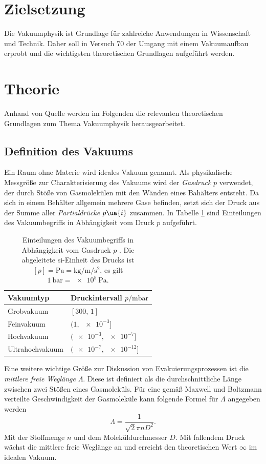 \setcounter{page}{1}
\section*{Zielsetzung}
Die Vakuumphysik ist Grundlage für zahlreiche Anwendungen in Wissenschaft und Technik. Daher
soll in Versuch 70 der Umgang mit einem Vakuumaufbau erprobt und die wichtigsten
theoretischen Grundlagen aufgeführt werden.
\section{Theorie}
Anhand von Quelle \cite{dem1} werden im Folgenden die relevanten theoretischen Grundlagen zum Thema
Vakuumphysik herausgearbeitet.
\subsection{Definition des Vakuums}
Ein Raum ohne Materie wird ideales Vakuum genannt. Als physikalische Messgröße zur Charakterisierung
des Vakuums wird der \emph{Gasdruck} $p$ verwendet, der durch Stöße von Gasmolekülen mit den Wänden eines Bahälters
entsteht. Da sich in einem Behälter allgemein mehrere Gase befinden, setzt sich der Druck aus der Summe aller
\emph{Partialdrücke} $p\ua{i}$ zusammen.
In Tabelle \ref{tab: vakuumbegriffe} sind Einteilungen des Vakuumbegriffs in Abhängigkeit vom
Druck $p$ aufgeführt.
\begin{table}
  \centering
  \caption{Einteilungen des Vakuumbegriffs in Abhängigkeit vom Gasdruck $p$ \cite{dem1}. Die abgeleitete si-Einheit des Drucks ist
  $[p] = \si{\pascal} = \si{\kilogram \per\meter\per \second\squared}$, es gilt $\SI{1}{\bar} = \SI{e5}{\pascal}$.}
  \label{tab: vakuumbegriffe}
  \begin{tabular}{l l}
    \toprule
    {Vakuumtyp} & {Druckintervall $p/\si{\milli\bar}$} \\
    \midrule
    Grobvakuum &  $[\num{300},\,\num{1}]$ \\
    Feinvakuum &  $(\num{1},\,\num{e-3}]$ \\
    Hochvakuum &  $(\num{e-3},\,\num{e-7}]$ \\
    Ultrahochvakuum &  $(\num{e-7},\,\num{e-12}]$ \\
    \bottomrule
  \end{tabular}
\end{table}
\FloatBarrier Eine weitere wichtige Größe zur Diskussion von Evakuierungsprozessen ist die \emph{mittlere freie
Weglänge} $\Lambda$. Diese ist definiert als die durchschnittliche Länge zwischen zwei Stößen
eines Gasmoleküls. Für eine gemäß Maxwell und Boltzmann verteilte Geschwindigkeit der Gasmoleküle kann
folgende Formel für $\Lambda$ angegeben werden
\begin{equation}
  \Lambda = \frac{1}{\sqrt{2}\pi n D^2}.
\end{equation}
Mit der Stoffmenge $n$ und dem Moleküldurchmesser $D$. Mit fallendem Druck wächst die mittlere freie  %
Weglänge an und erreicht den theoretischen Wert $\infty$ im idealen Vakuum.

